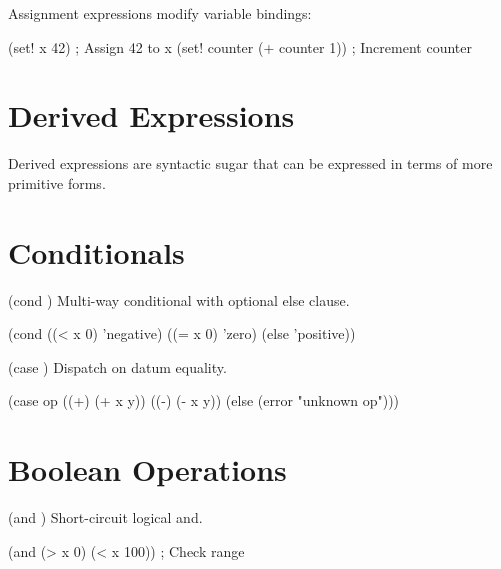 Assignment expressions modify variable bindings:

\begin{grammar}
\end{grammar}

\begin{example}[Assignment]
\begin{lambdustcode}
(set! x 42)        ; Assign 42 to x
(set! counter (+ counter 1))  ; Increment counter
\end{lambdustcode}
\end{example}

\section{Derived Expressions}
\label{sec:derived}


Derived expressions are syntactic sugar that can be expressed in terms of more primitive forms.

\section{Conditionals}
\label{sec:derived-conditionals}

\begin{syntaxspec}{(cond )}
Multi-way conditional with optional else clause.
\begin{lambdustcode}
(cond ((< x 0) 'negative)
      ((= x 0) 'zero)  
      (else 'positive))
\end{lambdustcode}
\end{syntaxspec}

\begin{syntaxspec}{(case  )}
Dispatch on datum equality.
\begin{lambdustcode}
(case op
  ((+) (+ x y))
  ((-) (- x y))
  (else (error "unknown op")))
\end{lambdustcode}
\end{syntaxspec}

\section{Boolean Operations}
\label{sec:boolean-ops}

\begin{syntaxspec}{(and )}
Short-circuit logical and.
\begin{lambdustcode}
(and (> x 0) (< x 100))    ; Check range
\end{lambdustcode}
\end{syntaxspec}

